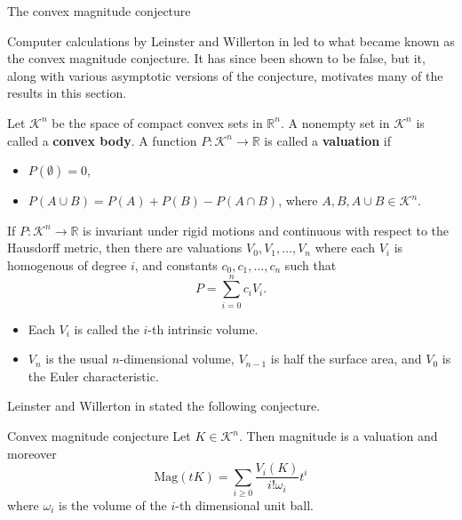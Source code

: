 \documentclass[12pt,mathserif]{beamer}
\begin{document}
\begin{frame}[allowframebreaks]{The convex magnitude conjecture}

Computer calculations by Leinster and Willerton in \cite{leinster_asymptotic_2013} led to what became known as the convex magnitude conjecture. It has since been shown to be false, but it, along with various asymptotic versions of the conjecture, motivates many of the results in this section.

\begin{definition}
Let $\mathcal{K}^n$ be the space of compact convex sets in $\mathbb{R}^n$. A nonempty set in $\mathcal{K}^n$ is called a \textbf{convex body}. A function $P:\mathcal{K}^n \to \mathbb{R}$ is called a \textbf{valuation} if
\begin{itemize}
\item $P(\emptyset) = 0$,
\item $P(A\cup B) = P(A) + P(B) - P(A\cap B)$, where $A,B, A\cup B \in \mathcal{K}^n$.
\end{itemize}
\end{definition}

\framebreak

\begin{theorem}
If $P:\mathcal{K}^n \to \mathbb{R}$ is invariant under rigid motions and continuous with respect to the Hausdorff metric, then there are valuations $V_0,V_1,\dots,V_n$ where each $V_i$ is homogenous of degree $i$, and constants $c_0,c_1,\dots,c_n$ such that
\begin{equation*}
P = \sum\limits_{i=0}^n c_i V_i.
\end{equation*}
\end{theorem}

\begin{itemize}
\item Each $V_i$ is called the $i$-th intrinsic volume.
\item $V_n$ is the usual $n$-dimensional volume, $V_{n-1}$ is half the surface area, and $V_0$ is the Euler characteristic.
\end{itemize}

\framebreak

Leinster and Willerton in \cite{leinster_asymptotic_2013} stated the following conjecture.

\begin{block}{Convex magnitude conjecture}
Let $K \in \mathcal{K}^n$. Then magnitude is a valuation and moreover
\begin{equation*}
\text{Mag}(tK) = \sum\limits_{i\geq0}\frac{V_i(K)}{i!\omega_i}t^i
\end{equation*}
where $\omega_i$ is the volume of the $i$-th dimensional unit ball.
\end{block}


\end{frame}
\end{document}
